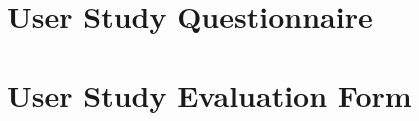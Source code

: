 \documentclass[10pt,a4paper]{scrartcl}
\begin{document}
\clearpage






\appendix

\renewcommand\appendixpagename{\usekomafont{disposition}Appendices}
\appendixpage

\section{User Study Questionnaire}
\label{apx:questionnaire}


\section{User Study Evaluation Form}
\label{apx:evaluation-form}

\end{document}
